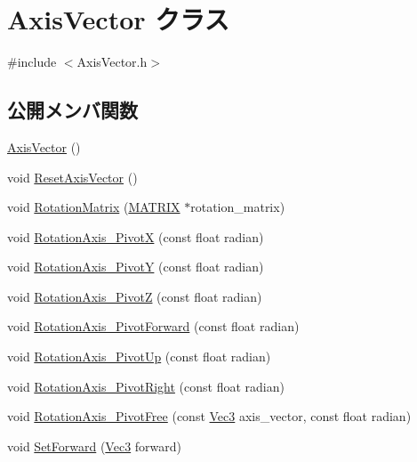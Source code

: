 \hypertarget{class_axis_vector}{}\section{Axis\+Vector クラス}
\label{class_axis_vector}


{\ttfamily \#include $<$Axis\+Vector.\+h$>$}

\subsection*{公開メンバ関数}
\begin{DoxyCompactItemize}
\item 
\mbox{\hyperlink{class_axis_vector_ae77a05cd990defedbd04914dba1f2326}{Axis\+Vector}} ()
\item 
void \mbox{\hyperlink{class_axis_vector_a1414c1390a31d9e98c26d9803c61d2b8}{Reset\+Axis\+Vector}} ()
\item 
void \mbox{\hyperlink{class_axis_vector_a33aab769ff2de997393c13414fa23873}{Rotation\+Matrix}} (\mbox{\hyperlink{_vector3_d_8h_a032295cd9fb1b711757c90667278e744}{M\+A\+T\+R\+IX}} $\ast$rotation\+\_\+matrix)
\item 
void \mbox{\hyperlink{class_axis_vector_ad3110d0a45e303109caa1e0dfb2ca027}{Rotation\+Axis\+\_\+\+PivotX}} (const float radian)
\item 
void \mbox{\hyperlink{class_axis_vector_aee4198c9fcf78d6912b129e2210a58fa}{Rotation\+Axis\+\_\+\+PivotY}} (const float radian)
\item 
void \mbox{\hyperlink{class_axis_vector_adde5b636a046a4fe6c5c943646045843}{Rotation\+Axis\+\_\+\+PivotZ}} (const float radian)
\item 
void \mbox{\hyperlink{class_axis_vector_a42872a62f656e7249af84e39fd519475}{Rotation\+Axis\+\_\+\+Pivot\+Forward}} (const float radian)
\item 
void \mbox{\hyperlink{class_axis_vector_ad33eef7f1b3912b6a1d0eaa18fff8f29}{Rotation\+Axis\+\_\+\+Pivot\+Up}} (const float radian)
\item 
void \mbox{\hyperlink{class_axis_vector_a71a7638817a488d824cdc757d4e28a0c}{Rotation\+Axis\+\_\+\+Pivot\+Right}} (const float radian)
\item 
void \mbox{\hyperlink{class_axis_vector_a7cab74dd54bf4fc97770aee2278f2fa4}{Rotation\+Axis\+\_\+\+Pivot\+Free}} (const \mbox{\hyperlink{_vector3_d_8h_ab16f59e4393f29a01ec8b9bbbabbe65d}{Vec3}} axis\+\_\+vector, const float radian)
\item 
void \mbox{\hyperlink{class_axis_vector_ac429404c0b565c24307da4442e49bb61}{Set\+Forward}} (\mbox{\hyperlink{_vector3_d_8h_ab16f59e4393f29a01ec8b9bbbabbe65d}{Vec3}} forward)

\end{DoxyCompactItemize}
